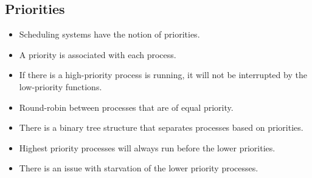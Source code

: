 \documentclass[]{article}
\begin{document}
\subsection{Priorities}
\begin{itemize}
\item Scheduling systems have the notion of priorities.
\item A priority is associated with each process.
\item If there is a high-priority process is running, it will not be interrupted
by the low-priority functions.
\item Round-robin between processes that are of equal priority.
\item There is a binary tree structure that separates processes based on
priorities.
\item Highest priority processes will always run before the lower priorities.
\item There is an issue with starvation of the lower priority processes.
\end{itemize}
\end{document}
